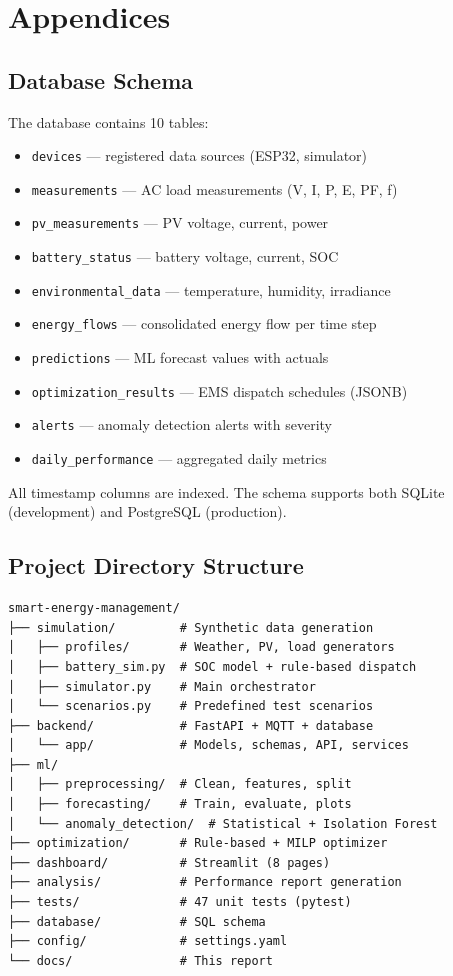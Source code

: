 \chapter{Appendices}
\label{ch:appendix}

\section{Database Schema}

The database contains 10 tables:

\begin{itemize}[nosep]
    \item \texttt{devices} --- registered data sources (ESP32, simulator)
    \item \texttt{measurements} --- AC load measurements (V, I, P, E, PF, f)
    \item \texttt{pv\_measurements} --- PV voltage, current, power
    \item \texttt{battery\_status} --- battery voltage, current, SOC
    \item \texttt{environmental\_data} --- temperature, humidity, irradiance
    \item \texttt{energy\_flows} --- consolidated energy flow per time step
    \item \texttt{predictions} --- ML forecast values with actuals
    \item \texttt{optimization\_results} --- EMS dispatch schedules (JSONB)
    \item \texttt{alerts} --- anomaly detection alerts with severity
    \item \texttt{daily\_performance} --- aggregated daily metrics
\end{itemize}

All timestamp columns are indexed. The schema supports both SQLite (development) and PostgreSQL (production).

\section{Project Directory Structure}

\begin{verbatim}
smart-energy-management/
├── simulation/         # Synthetic data generation
│   ├── profiles/       # Weather, PV, load generators
│   ├── battery_sim.py  # SOC model + rule-based dispatch
│   ├── simulator.py    # Main orchestrator
│   └── scenarios.py    # Predefined test scenarios
├── backend/            # FastAPI + MQTT + database
│   └── app/            # Models, schemas, API, services
├── ml/
│   ├── preprocessing/  # Clean, features, split
│   ├── forecasting/    # Train, evaluate, plots
│   └── anomaly_detection/  # Statistical + Isolation Forest
├── optimization/       # Rule-based + MILP optimizer
├── dashboard/          # Streamlit (8 pages)
├── analysis/           # Performance report generation
├── tests/              # 47 unit tests (pytest)
├── database/           # SQL schema
├── config/             # settings.yaml
└── docs/               # This report
\end{verbatim}

